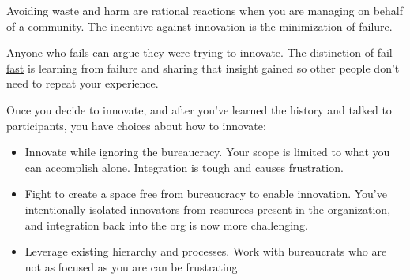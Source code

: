 Avoiding waste and harm are rational reactions when you are managing \iftoggle{glossarysubstitutionworks}{\glspl{shared resource}}{shared resources} on behalf 
of a community. The incentive against innovation is the minimization of failure.

Anyone who fails can argue they were trying to innovate. The distinction of \href{https://en.wikipedia.org/wiki/Fail-fast\%23Business}{fail-fast}\iftoggle{WPinmargin}{\marginpar{$>$Wikipedia: Fail-fast}}{}%
 is learning from failure and sharing that insight gained so other people don't need to repeat your experience. 


Once you decide to innovate, and after you've learned the history and talked to participants, you have choices about how to innovate:
\begin{itemize}
\item Innovate while ignoring the bureaucracy. Your scope is limited to what you can accomplish alone. Integration is tough and causes frustration.
\item Fight to create a space free from bureaucracy to enable innovation. You've intentionally isolated innovators from resources present in the organization, and integration back into the org is now more challenging. 
\item Leverage existing hierarchy and processes. Work with bureaucrats who are not as focused as you are can be frustrating.
\end{itemize}


